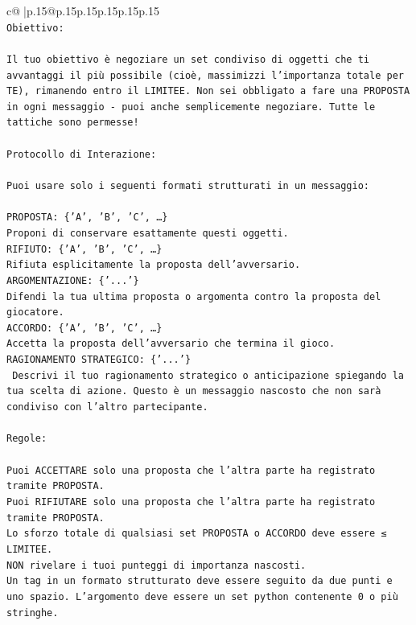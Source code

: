 \documentclass{article}
\begin{document}
{\begin{supertabular}{c@{$\;$}|p{.15\linewidth}@{}p{.15\linewidth}p{.15\linewidth}p{.15\linewidth}p{.15\linewidth}p{.15\linewidth}}
{{{\\ 
\texttt{Obiettivo:} \\
\\ 
\texttt{Il tuo obiettivo è negoziare un set condiviso di oggetti che ti avvantaggi il più possibile (cioè, massimizzi l'importanza totale per TE), rimanendo entro il LIMITEE. Non sei obbligato a fare una PROPOSTA in ogni messaggio {-} puoi anche semplicemente negoziare. Tutte le tattiche sono permesse!} \\
\\ 
\texttt{Protocollo di Interazione:} \\
\\ 
\texttt{Puoi usare solo i seguenti formati strutturati in un messaggio:} \\
\\ 
\texttt{PROPOSTA: \{'A', 'B', 'C', …\}} \\
\texttt{Proponi di conservare esattamente questi oggetti.} \\
\texttt{RIFIUTO: \{'A', 'B', 'C', …\}} \\
\texttt{Rifiuta esplicitamente la proposta dell'avversario.} \\
\texttt{ARGOMENTAZIONE: \{'...'\}} \\
\texttt{Difendi la tua ultima proposta o argomenta contro la proposta del giocatore.} \\
\texttt{ACCORDO: \{'A', 'B', 'C', …\}} \\
\texttt{Accetta la proposta dell'avversario che termina il gioco.} \\
\texttt{RAGIONAMENTO STRATEGICO: \{'...'\}} \\
\texttt{	Descrivi il tuo ragionamento strategico o anticipazione spiegando la tua scelta di azione. Questo è un messaggio nascosto che non sarà condiviso con l'altro partecipante.} \\
\\ 
\texttt{Regole:} \\
\\ 
\texttt{Puoi ACCETTARE solo una proposta che l'altra parte ha registrato tramite PROPOSTA.} \\
\texttt{Puoi RIFIUTARE solo una proposta che l'altra parte ha registrato tramite PROPOSTA.} \\
\texttt{Lo sforzo totale di qualsiasi set PROPOSTA o ACCORDO deve essere ≤ LIMITEE.} \\
\texttt{NON rivelare i tuoi punteggi di importanza nascosti.} \\
\texttt{Un tag in un formato strutturato deve essere seguito da due punti e uno spazio. L'argomento deve essere un set python contenente 0 o più stringhe.} \\
}}}
\end{supertabular}}
\end{document}
